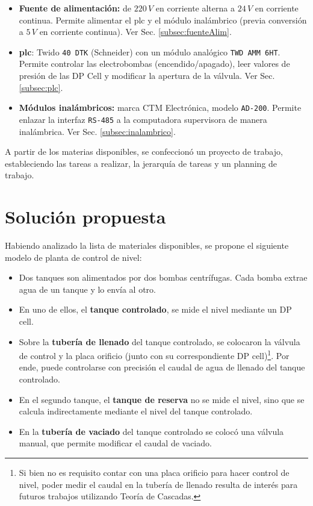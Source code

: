 \begin{itemize}
  \item \textbf{Fuente de alimentación:}
  de $220\,V$ en corriente alterna a $24\,V$ en corriente continua.
  Permite alimentar el \gls{plc} y el módulo inalámbrico (previa conversión a
  $5\,V$ en corriente continua).
  Ver Sec. \ref{subsec:fuenteAlim}.

  \item{\textbf{\gls{plc}}}: Twido \verb|40 DTK| (Schneider) con un módulo
  analógico \verb|TWD AMM 6HT|.
  Permite controlar las electrobombas (encendido/apagado),
  leer valores de presión de las DP Cell y modificar la apertura de la 
  válvula. Ver Sec. \ref{subsec:plc}.

  \item \textbf{Módulos inalámbricos:} marca CTM Electrónica,
  modelo \verb|AD-200|.
  Permite enlazar la interfaz \verb|RS-485| a la computadora supervisora
  de manera inalámbrica. Ver Sec. \ref{subsec:inalambrico}.
\end{itemize}

A partir de los materias disponibles, se confeccionó
un proyecto de trabajo, estableciendo las tareas a realizar, la jerarquía de
tareas y un planning de trabajo.

\section{Solución propuesta}
\label{sec:SolucionPropuesta}

Habiendo analizado la lista de materiales disponibles, se propone el siguiente
modelo de planta de control de nivel:
\begin{itemize}
 \item Dos tanques son alimentados por dos bombas centrífugas.
 Cada bomba extrae agua de un tanque y lo envía al otro.
 \item En uno de ellos, el \textbf{tanque controlado}, se mide el nivel
 mediante un DP cell.
 \item Sobre la \textbf{tubería de llenado} del tanque controlado, se
 colocaron la válvula de control y la placa orificio (junto
con su correspondiente DP cell)\footnote{Si bien no es  requisito contar con
una placa orificio para hacer  control de nivel,  poder medir el caudal en la
tubería de llenado resulta  de  interés para  futuros trabajos  utilizando
Teoría de Cascadas.}.
 Por ende, puede controlarse con precisión el caudal de agua de llenado del
 tanque controlado.
 \item En el segundo tanque, el \textbf{tanque de reserva} no se mide
 el  nivel, sino que se calcula indirectamente mediante el nivel del tanque
 controlado.
 \item En la \textbf{tubería de vaciado} del tanque controlado se colocó una
válvula manual, que permite modificar el caudal de vaciado.
\end{itemize}

